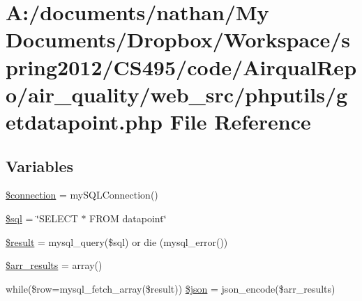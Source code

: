 \hypertarget{getdatapoint_8php}{\section{A\-:/documents/nathan/\-My Documents/\-Dropbox/\-Workspace/spring2012/\-C\-S495/code/\-Airqual\-Repo/air\-\_\-quality/web\-\_\-src/phputils/getdatapoint.php File Reference}
\label{getdatapoint_8php}
}
\subsection*{Variables}
\begin{DoxyCompactItemize}
\item 
\hyperlink{getdatapoint_8php_a0d9c79b9b86b3f5891c6d3892f12c6a0}{\$connection} = my\-S\-Q\-L\-Connection()
\item 
\hyperlink{getdatapoint_8php_a047170d6020a882807665812a27e2525}{\$sql} = \char`\"{}S\-E\-L\-E\-C\-T $\ast$ F\-R\-O\-M datapoint\char`\"{}
\item 
\hyperlink{getdatapoint_8php_a112ef069ddc0454086e3d1e6d8d55d07}{\$result} = mysql\-\_\-query(\$sql) or die (mysql\-\_\-error())
\item 
\hyperlink{getdatapoint_8php_a0774b147e1e9ba3e6ba73b927a2ef77e}{\$arr\-\_\-results} = array()
\item 
while(\$row=mysql\-\_\-fetch\-\_\-array(\$result)) \hyperlink{getdatapoint_8php_a0f6ba5ad8be49dce0e92b58a3a8c4de7}{\$json} = json\-\_\-encode(\$arr\-\_\-results)
\end{DoxyCompactItemize}



